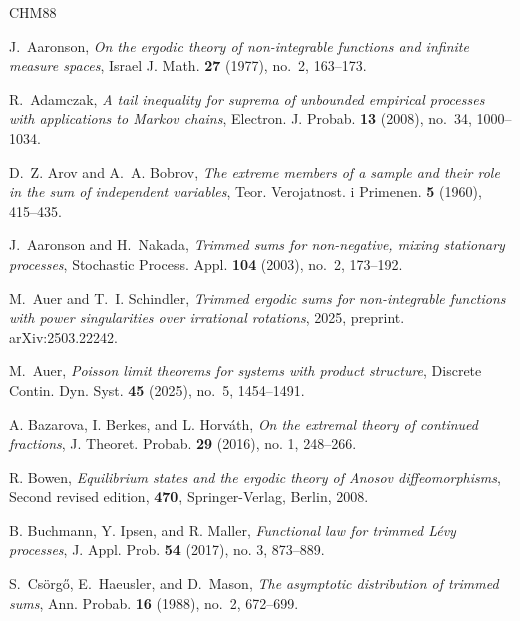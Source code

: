 \documentclass[11pt,twoside,a4paper,reqno]{amsart}
\begin{document}
\providecommand{\bysame}{\leavevmode\hbox to3em{\hrulefill}\thinspace}
\providecommand{\MR}{\relax\ifhmode\unskip\space\fi MR }
\providecommand{\MRhref}[2]{%
  \href{http://www.ams.org/mathscinet-getitem?mr=#1}{#2}
}
\providecommand{\href}[2]{#2}
\begin{thebibliography}{CHM88}


J.~Aaronson, \emph{On the ergodic theory of non-integrable functions and
  infinite measure spaces}, Israel J. Math. \textbf{27} (1977), no.~2,
  163--173.

R.~Adamczak, \emph{A tail inequality for suprema of unbounded empirical
  processes with applications to Markov chains}, Electron. J. Probab.
  \textbf{13} (2008), no.~34, 1000--1034.

D.~Z. Arov and A.~A. Bobrov, \emph{The extreme members of a sample and their
  role in the sum of independent variables}, Teor. Verojatnost. i Primenen.
  \textbf{5} (1960), 415--435.

J.~Aaronson and H.~Nakada, \emph{Trimmed sums for non-negative, mixing
  stationary processes}, Stochastic Process. Appl. \textbf{104} (2003), no.~2,
  173--192.




M.~Auer and T.~I. Schindler, \emph{Trimmed ergodic sums for non-integrable
  functions with power singularities over irrational rotations}, 2025, preprint. \href{https://arxiv.org/abs/2503.22242}{arXiv:2503.22242}.

M.~Auer, \emph{Poisson limit theorems for systems with product structure},
  Discrete Contin. Dyn. Syst. \textbf{45} (2025), no.~5, 1454--1491.


 A. Bazarova, I. Berkes, and L. Horv\'{a}th, \emph{On the extremal theory of continued fractions}, J. Theoret. Probab. \textbf{29} (2016), no. 1, 248--266.


R. Bowen, \emph{Equilibrium states and the ergodic theory of Anosov diffeomorphisms}, Second revised edition, \textbf{470}, Springer-Verlag, Berlin, 2008.

 B. Buchmann, Y. Ipsen, and R. Maller, \emph{Functional law for trimmed L\'{e}vy processes},  J. Appl. Prob. \textbf{54} (2017), no. 3, 873--889.

S.~Cs\"org\H{o}, E.~Haeusler, and D.~Mason, \emph{The asymptotic distribution of
  trimmed sums}, Ann. Probab. \textbf{16} (1988), no.~2, 672--699.


\end{thebibliography}
\end{document}

